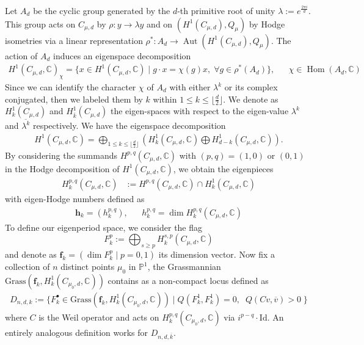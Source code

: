 \documentclass[12pt, letterpaper]{amsart}
\theoremstyle{plain}
\theoremstyle{definition}
\DeclareMathOperator{\Hom}{Hom}
\DeclareMathOperator{\Aut}{Aut}
\newcommand{\C}{\mathbb{C}}
\begin{document}
Let $A_d$ be the cyclic group generated by  the $d$-th primitive root of unity $\lambda := e^{\frac{2 \pi i}{d}}$. 
This group acts on $C_{\mu,d}$ by $\rho: y\rightarrow \lambda y$ and on $(H^{1}(C_{\mu,d}),Q_{\mu})$ by Hodge isometries via a linear representation 
$\rho^*: A_d \longrightarrow  \Aut(H^{1}(C_{\mu,d}),Q_{\mu})$.
The action of $A_d$ induces an eigenspace decomposition 
\begin{align*}
H^{1}(C_{\mu,d}, \mathbb{C})_{\chi} 
=
\lbrace
x \in 
H^{1}(C_{\mu,d}, \mathbb{C})
\;  | \; 
g \cdot x = \chi(g) x, \; \forall g \in \rho^*(A_d)
\rbrace,
&&
\chi \in \Hom\left(A_d, \C \right)
\end{align*}
Since we can identify the character $\chi$ of $A_d$ with either $\lambda^k$ or its complex conjugated, then we labeled them by 
$k$ within $1 \leq k \leq \lfloor \frac{d}{2}\rfloor$.
We denote as $ H^1_{k}(C_{\mu,d}) $ 
and $ H^1_{\overline{k}}(C_{\mu,d}) $
the eigen-spaces with respect to the eigen-value $\lambda^k$ and $\overline{\lambda^k}$ respectively. We have  the eigenspace decomposition
\begin{align*}
H^1(C_{\mu,d}, \mathbb{C})
=
\bigoplus_{
1\leq k\leq \big\lfloor \frac{d}{2}\big\rfloor    
} \left( 
H^1_{k}(C_{\mu,d},  \mathbb{C}) \bigoplus 
H^1_{d-k}(C_{\mu,d},\mathbb{C}) \right).
\end{align*}
By considering the summands 
$H^{p,q}(C_{\mu,d}, \mathbb{C})$ with  $(p,q)=(1,0)$ or $(0,1)$ in the Hodge decomposition of $H^{1}(C_{\mu,d}, \mathbb{C})$, we obtain the eigenpieces
\begin{align*}
H^{p,q}_k(C_{\mu,d}, \mathbb{C})
&:=
H^{p,q}(C_{\mu,d}, \mathbb{C}) \cap 
H^{1}_k(C_{\mu,d}, \mathbb{C})
\end{align*}
with eigen-Hodge numbers defined as
\begin{align}\label{eq:EigenHodgeNumbers}
\mathbf{h}_k=(h^{p,q}_k),   
&&
h^{p,q}_k = \dim H^{p,q}_k(C_{\mu,d}, \mathbb{C})
\end{align}
To define our eigenperiod space, we consider the flag 
$$
F^{p}_{k} := 
\bigoplus_{s \geq p} H^{s,p}_k(C_{\mu,d}, \mathbb{C})
$$
and denote  as $\mathbf{f}_k= (\dim F_k^{p} \;| \; p=0, 1)$ its dimension vector. Now fix a collection of $n$ distinct points $\mu_0$ in $\mathbb{P}^1$, the Grassmannian
$ \mathrm{Grass}( \mathbf{f}_k, H^{1}_k(C_{\mu_0,d}, \mathbb{C})) $ contains as a non-compact locus  defined as
\begin{align}\label{eq:Eigenspace}
D_{n,d,k}:=
\lbrace
F^{\bullet}_{k} \in \mathrm{Grass}( \mathbf{f}_k, 
H^{1}_k(C_{\mu_0,d}, \mathbb{C})
)
\; \big| \;
Q(F_k^1,F_k^1)=0, \;\;
Q(Cv, \overline{v}) > 0 \; 
\rbrace 
\end{align}
where $C$ is the Weil operator and acts on $H^{p,q}_k(C_{\mu_0,d}, \mathbb{C})$ via $i^{p-q}\cdot \mathrm{Id}$. An entirely analogous definition works for $D_{n,d,\overline{k}}$. 
\end{document}
